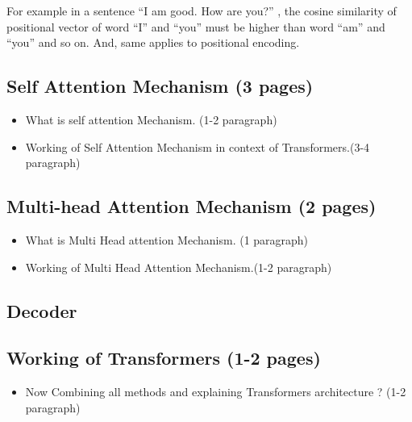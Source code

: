 \documentclass[%
	BCOR=8mm, %
	DIV=12, 
	toc=bibliography, %
	toc=listof, %
	oneside, %
	egregdoesnotlikesansseriftitles, %
	]{scrbook}
\begin{document}
For example in a sentence ``I am good. How are you?'' , the cosine similarity of positional vector of word ``I'' and ``you'' must be higher than word ``am'' and ``you'' and so on. And, same applies to positional encoding. 

\subsection{Self Attention Mechanism (3 pages)}
\begin{itemize}
\item What is self attention Mechanism. (1-2 paragraph)
\item Working of Self Attention Mechanism in context of Transformers.(3-4 paragraph)
\end{itemize}

\subsection{Multi-head Attention Mechanism (2 pages)}
\begin{itemize}
\item What is Multi Head attention Mechanism. (1 paragraph)
\item Working of Multi Head Attention Mechanism.(1-2 paragraph)
\end{itemize}


\subsection{Decoder}

\subsection{ Working of Transformers (1-2 pages)}
\begin{itemize}
\item Now Combining all methods and explaining Transformers architecture ? (1-2 paragraph)
\end{itemize}
\end{document}
